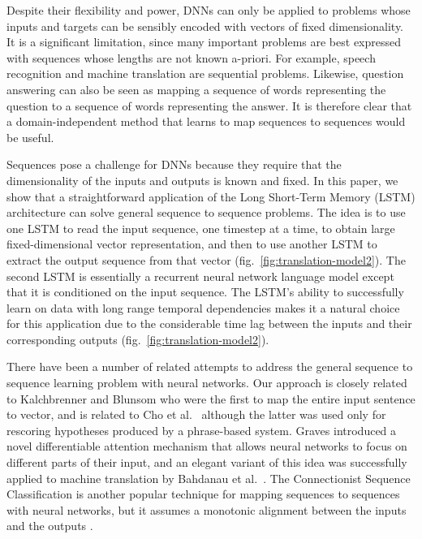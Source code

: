 \documentclass{article}
\begin{document}
Despite their flexibility and power, DNNs can only be applied to
problems whose inputs and targets can be sensibly encoded with vectors
of fixed dimensionality.  It is a significant limitation, since many
important problems are best expressed with sequences whose lengths are
not known a-priori.  For example, speech recognition and machine
translation are sequential problems.  Likewise, question answering can
also be seen as mapping a sequence of words representing the question
to a sequence of words representing the answer.  It is therefore clear
that a domain-independent method that learns to map sequences to
sequences would be useful.

Sequences pose a challenge for DNNs because they require that the
dimensionality of the inputs and outputs is known and fixed.  
In this paper, we show that a straightforward application of the Long
Short-Term Memory (LSTM) architecture \cite{hochreiter97} can solve
general sequence to sequence problems.  The idea is to use one LSTM to
read the input sequence, one timestep at a time, to obtain large
fixed-dimensional vector representation, and then to use another LSTM
to extract the output sequence from that vector
(fig.~\ref{fig:translation-model2}).  The second LSTM is essentially a
recurrent neural network language model
\cite{rumelhart1986learning,mikolov2010recurrent,sundermeyer12} except
that it is conditioned on the input sequence.  The LSTM's ability to
successfully learn on data with long range temporal dependencies makes
it a natural choice for this application due to the considerable time
lag between the inputs and their corresponding outputs
(fig.~\ref{fig:translation-model2}).

There have been a number of related attempts to address the general
sequence to sequence learning problem with neural networks.   Our
approach is closely related to Kalchbrenner and Blunsom \cite{kal13} who were
the first to map the entire input sentence to vector, and is related 
to Cho et al.~\cite{cho14} although the latter was used only for rescoring hypotheses
produced by a phrase-based system.  Graves
\cite{graves13c} introduced a novel differentiable attention mechanism
that allows neural networks to focus on different parts
of their input, and an elegant variant of this idea was successfully
applied to machine translation by Bahdanau et al.~\cite{bog14}.  The Connectionist
Sequence Classification is another popular technique for mapping sequences
to sequences with neural networks, but it assumes a monotonic alignment
between the inputs and the outputs \cite{graves1}.
\end{document}
